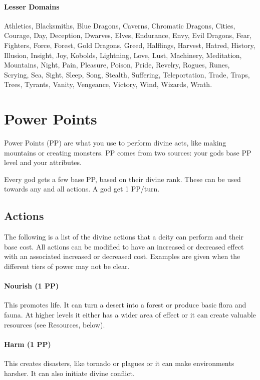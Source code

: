 \documentclass[10pt,a4paper]{article}
\begin{document}
\paragraph*{Lesser Domains}
Athletics, Blacksmiths, Blue Dragons, Caverns, Chromatic Dragons, Cities, Courage, Day, Deception, Dwarves, Elves, Endurance, Envy, Evil Dragons, Fear, Fighters, Force, Forest, Gold Dragons, Greed, Halflings, Harvest, Hatred, History, Illusion, Insight, Joy, Kobolds, Lightning, Love, Lust, Machinery, Meditation, Mountains, Night, Pain, Pleasure, Poison, Pride, Revelry, Rogues, Runes, Scrying, Sea, Sight, Sleep, Song, Stealth, Suffering, Teleportation, Trade, Traps, Trees, Tyrants, Vanity, Vengeance, Victory, Wind, Wizards, Wrath.



\section*{Power Points}
Power Points (PP) are what you use to perform divine acts, like making mountains or creating monsters. PP comes from two sources: your gods base PP level and your attributes.

Every god gets a few base PP, based on their divine rank. These can be used towards any and all actions. A god get 1 PP/turn.



\subsection*{Actions}
The following is a list of the divine actions that a deity can perform and their base cost. All actions can be modified to have an increased or decreased effect with an associated increased or decreased cost. Examples are given when the different tiers of power may not be clear.

\paragraph*{Nourish (1 PP)}  This promotes life. It can turn a desert into a forest or produce basic flora and fauna. At higher levels it either has a wider area of effect or it can create valuable resources (see Resources, below).

\paragraph*{Harm (1 PP)}  This creates disasters, like tornado or plagues or it can make environments harsher. It can also initiate divine conflict.
\end{document}
